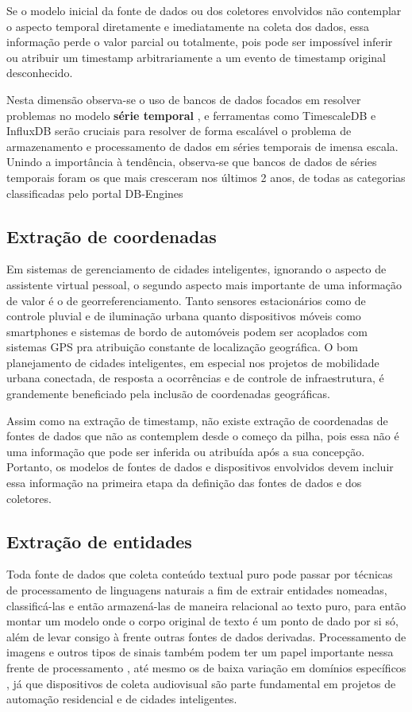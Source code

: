 Se o modelo inicial da fonte de dados ou dos coletores envolvidos não contemplar o aspecto temporal diretamente e imediatamente na coleta dos dados, essa informação perde o valor parcial ou totalmente, pois pode ser impossível inferir ou atribuir um timestamp arbitrariamente a um evento de timestamp original desconhecido.

Nesta dimensão observa-se o uso de bancos de dados focados em resolver problemas no modelo \textbf{série temporal} \cite{influxdata:explained}, e ferramentas como TimescaleDB \cite{timescaledb} e InfluxDB \cite{influxdb} serão cruciais para resolver de forma escalável o problema de armazenamento e processamento de dados em séries temporais de imensa escala. Unindo a importância à tendência, observa-se que bancos de dados de séries temporais foram os que mais cresceram nos últimos 2 anos, de todas as categorias classificadas pelo portal DB-Engines \cite{dbengines:trends}

\subsection{Extração de coordenadas}

Em sistemas de gerenciamento de cidades inteligentes, ignorando o aspecto de assistente virtual pessoal, o segundo aspecto mais importante de uma informação de valor é o de georreferenciamento. Tanto sensores estacionários como de controle pluvial e de iluminação urbana quanto dispositivos móveis como smartphones e sistemas de bordo de automóveis podem ser acoplados com sistemas GPS pra atribuição constante de localização geográfica. O bom planejamento de cidades inteligentes, em especial nos projetos de mobilidade urbana conectada, de resposta a ocorrências e de controle de infraestrutura, é grandemente beneficiado pela inclusão de coordenadas geográficas.

Assim como na extração de timestamp, não existe extração de coordenadas de fontes de dados que não as contemplem desde o começo da pilha, pois essa não é uma informação que pode ser inferida ou atribuída após a sua concepção. Portanto, os modelos de fontes de dados e dispositivos envolvidos devem incluir essa informação na primeira etapa da definição das fontes de dados e dos coletores.

\subsection{Extração de entidades}

Toda fonte de dados que coleta conteúdo textual puro pode passar por técnicas de processamento de linguagens naturais a fim de extrair entidades nomeadas, classificá-las e então armazená-las de maneira relacional ao texto puro, para então montar um modelo onde o corpo original de texto é um ponto de dado por si só, além de levar consigo à frente outras fontes de dados derivadas. Processamento de imagens e outros tipos de sinais também podem ter um papel importante nessa frente de processamento \cite{cornel:ner}, até mesmo os de baixa variação em domínios específicos \cite{aalto:ner}, já que dispositivos de coleta audiovisual são parte fundamental em projetos de automação residencial e de cidades inteligentes.

